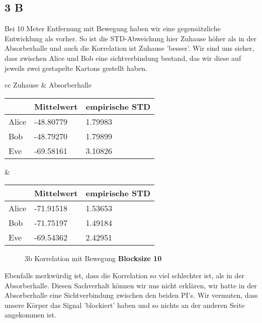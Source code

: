\documentclass[12pt,a4paper]{article}
\begin{document}
\subsection*{3 B}
Bei 10 Meter Entfernung mit Bewegung haben wir eine gegensätzliche Entwicklung als vorher. So ist die STD-Abweichung hier Zuhause höher als in der Absorberhalle und auch die Korrelation ist Zuhause 'besser'. Wir sind uns sicher, dass zwischen Alice und Bob eine sichtverbindung bestand, das wir diese auf jeweils zwei gestapelte Kartons gestellt haben. 
\begin{table}[H]
\centering
\begin{tabular}{ cc }
Zuhause & Absorberhalle  \\
\begin{tabular}{l|l|l}
& Mittelwert & empirische STD \\
\hline
Alice & -48.80779 & 1.79983 \\
\hline
Bob & -48.79270 & 1.79899 \\
\hline
Eve & -69.58161 & 3.10826 \\
\end{tabular} &
\begin{tabular}{l|l|l}
& Mittelwert & empirische STD \\
\hline
Alice & -71.91518 & 1.53653 \\
\hline
Bob & -71.75197 & 1.49184 \\
\hline
Eve & -69.54362 & 2.42951 \\
\end{tabular}
\end{tabular}
\end{table}

\begin{figure}[H]
\centering
{}   \qquad
{}
\caption{3b Korrelation mit Bewegung  \textbf{Blocksize 10}}
\label{fig:3b}
\end{figure}
Ebenfalls merkwürdig ist, dass die Korrelation so viel schlechter ist, als in der Absorberhalle. Diesen Sachverhalt können wir uns nicht erklären, wir hatte in der Absorberhalle eine Sichtverbindung zwischen den beiden PI's. Wir vermuten, dass unsere Körper das Signal 'blockiert' haben und so nichts an der anderen Seite angekommen ist. 
\end{document}
